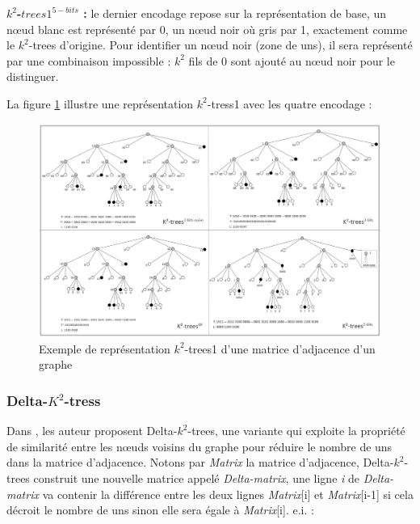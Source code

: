 \textbf{ $k^2$-$trees1^{5-bits}$ :} le dernier encodage repose sur la représentation de base, un nœud blanc est représenté par 0, un nœud noir où gris par 1, exactement comme le $k^2$-trees d'origine. Pour identifier un nœud noir (zone de uns), il sera représenté par une combinaison impossible : $k^2$ fils de 0 sont ajouté au nœud noir pour le distinguer.


La figure \ref{k2-trees1-exemple} illustre une représentation $k^2$-tress1 avec les quatre encodage : 


\begin{figure}[H]
\begin{center}
\includegraphics[height=300 pt, width=450 pt]{./ressources/image/k2-trees1.png} 
\end{center}
\caption{Exemple de représentation $k^2$-trees1 d'une matrice d'adjacence d'un graphe}
\label{k2-trees1-exemple}
\end{figure}


\subsubsection{Delta-$K^2$-tress }

Dans \citep{zhang2014delta}, les auteur proposent Delta-$k^2$-trees, une variante qui exploite la propriété de similarité entre les nœuds voisins du graphe pour réduire le nombre de uns dans la matrice d'adjacence. Notons par \textit{Matrix} la matrice d'adjacence, Delta-$k^2$-trees construit une nouvelle matrice appelé \textit{Delta-matrix}, une ligne \textit{i} de \textit{Delta-matrix} va contenir la différence entre les deux lignes \textit{Matrix}[i] et  \textit{Matrix}[i-1] si cela décroit le nombre de uns sinon elle sera égale à \textit{Matrix}[i]. e.i. : \\

